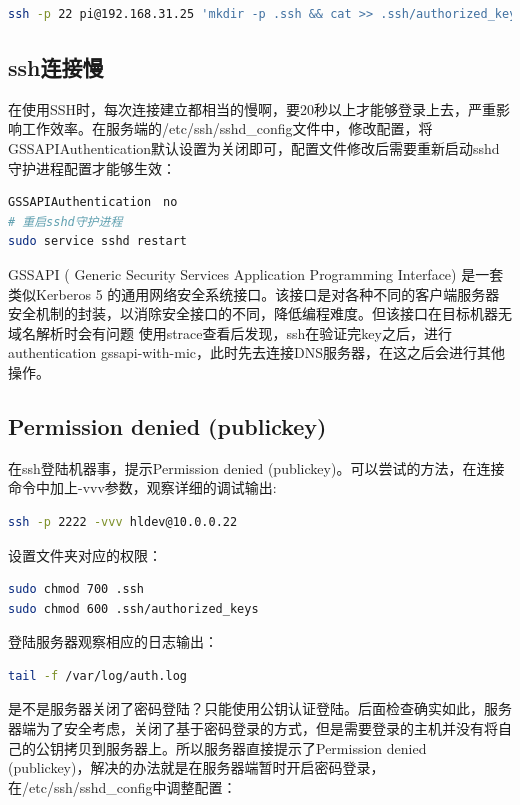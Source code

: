 \documentclass[letter]{book}
\begin{document}
\begin{lstlisting}[language=Bash]
ssh -p 22 pi@192.168.31.25 'mkdir -p .ssh && cat >> .ssh/authorized_keys' < ~/.ssh/id_rsa.pub
\end{lstlisting}

\subsection{ssh连接慢}

在使用SSH时，每次连接建立都相当的慢啊，要20秒以上才能够登录上去，严重影响工作效率。在服务端的/etc/ssh/sshd\_config文件中，修改配置，将GSSAPIAuthentication默认设置为关闭即可，配置文件修改后需要重新启动sshd守护进程配置才能够生效：

\begin{lstlisting}[language=Bash]
GSSAPIAuthentication　no
# 重启sshd守护进程
sudo service sshd restart
\end{lstlisting}

GSSAPI ( Generic Security Services Application Programming Interface) 是一套类似Kerberos 5 的通用网络安全系统接口。该接口是对各种不同的客户端服务器安全机制的封装，以消除安全接口的不同，降低编程难度。但该接口在目标机器无域名解析时会有问题
使用strace查看后发现，ssh在验证完key之后，进行authentication gssapi-with-mic，此时先去连接DNS服务器，在这之后会进行其他操作。

\subsection{Permission denied (publickey)}

在ssh登陆机器事，提示Permission denied (publickey)。可以尝试的方法，在连接命令中加上-vvv参数，观察详细的调试输出:

\begin{lstlisting}[language=Bash]
ssh -p 2222 -vvv hldev@10.0.0.22
\end{lstlisting}

设置文件夹对应的权限：

\begin{lstlisting}[language=Bash]
sudo chmod 700 .ssh
sudo chmod 600 .ssh/authorized_keys
\end{lstlisting}

登陆服务器观察相应的日志输出：

\begin{lstlisting}[language=Bash]
tail -f /var/log/auth.log
\end{lstlisting}

是不是服务器关闭了密码登陆？只能使用公钥认证登陆。后面检查确实如此，服务器端为了安全考虑，关闭了基于密码登录的方式，但是需要登录的主机并没有将自己的公钥拷贝到服务器上。所以服务器直接提示了Permission denied (publickey)，解决的办法就是在服务器端暂时开启密码登录，在/etc/ssh/sshd\_config中调整配置：
\end{document}
